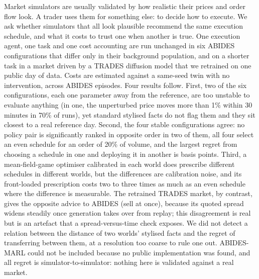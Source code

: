 Market simulators are usually validated by how realistic their prices and order flow look. A trader uses them for something else: to decide how to execute. We ask whether simulators that all look plausible recommend the same execution schedule, and what it costs to trust one when another is true. One execution agent, one task and one cost accounting are run unchanged in six ABIDES configurations that differ only in their background population, and on a shorter task in a market driven by a TRADES diffusion model that we retrained on one public day of data. Costs are estimated against a same-seed twin with no intervention, across \nEpisodes{} ABIDES episodes. Four results follow. First, two of the six configurations, each one parameter away from the reference, are too unstable to evaluate anything (in one, the unperturbed price moves more than 1\% within 30 minutes in 70\% of runs), yet standard stylised facts do not flag them and they sit closest to a real reference day. Second, the four stable configurations agree: no policy pair is significantly ranked in opposite order in two of them, all four select an even schedule for an order of 20\% of volume, and the largest regret from choosing a schedule in one and deploying it in another is \maxRegretStable{} basis points. Third, a mean-field-game optimiser calibrated in each world does prescribe different schedules in different worlds, but the differences are calibration noise, and its front-loaded prescription costs two to three times as much as an even schedule where the difference is measurable. The retrained TRADES market, by contrast, gives the opposite advice to ABIDES (sell at once), because its quoted spread widens steadily once generation takes over from replay; this disagreement is real but is an artefact that a spread-versus-time check exposes. We did not detect a relation between the distance of two worlds' stylised facts and the regret of transferring between them, at a resolution too coarse to rule one out. ABIDES-MARL could not be included because no public implementation was found, and all regret is simulator-to-simulator: nothing here is validated against a real market.
